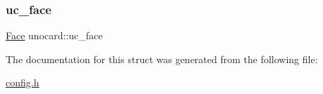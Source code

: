 \subsubsection{\texorpdfstring{uc\_face}{uc\_face}}
{\footnotesize\ttfamily \mbox{\hyperlink{config_8h_a80484981734e6c1484093a9f037e79c7}{Face}} unocard\+::uc\+\_\+face}



The documentation for this struct was generated from the following file\+:\begin{DoxyCompactItemize}
\item 
\mbox{\hyperlink{config_8h}{config.\+h}}\end{DoxyCompactItemize}
